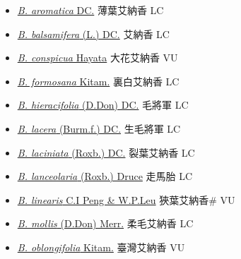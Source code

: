 \begin{itemize}
  \begin{itemize}
        \item[] \href{http://www.theplantlist.org/tpl1.1/search?q=Blumea+aromatica}{\textit{B. aromatica} DC.}   薄葉艾納香 LC
        \item[] \href{http://www.theplantlist.org/tpl1.1/search?q=Blumea+balsamifera}{\textit{B. balsamifera} (L.) DC.}   艾納香 LC
        \item[] \href{http://www.theplantlist.org/tpl1.1/search?q=Blumea+conspicua}{\textit{B. conspicua} Hayata}   大花艾納香 VU
        \item[] \href{http://www.theplantlist.org/tpl1.1/search?q=Blumea+formosana}{\textit{B. formosana} Kitam.}   裏白艾納香 LC
        \item[] \href{http://www.theplantlist.org/tpl1.1/search?q=Blumea+hieracifolia}{\textit{B. hieracifolia} (D.Don) DC.}   毛將軍 LC
        \item[] \href{http://www.theplantlist.org/tpl1.1/search?q=Blumea+lacera}{\textit{B. lacera} (Burm.f.) DC.}   生毛將軍 LC
        \item[] \href{http://www.theplantlist.org/tpl1.1/search?q=Blumea+laciniata}{\textit{B. laciniata} (Roxb.) DC.}   裂葉艾納香 LC
        \item[] \href{http://www.theplantlist.org/tpl1.1/search?q=Blumea+lanceolaria}{\textit{B. lanceolaria} (Roxb.) Druce}   走馬胎 LC
        \item[] \href{http://www.theplantlist.org/tpl1.1/search?q=Blumea+linearis}{\textit{B. linearis} C.I Peng \& W.P.Leu}   狹葉艾納香\# VU
        \item[] \href{http://www.theplantlist.org/tpl1.1/search?q=Blumea+mollis}{\textit{B. mollis} (D.Don) Merr.}   柔毛艾納香 LC
        \item[] \href{http://www.theplantlist.org/tpl1.1/search?q=Blumea+oblongifolia}{\textit{B. oblongifolia} Kitam.}   臺灣艾納香 VU

\end{itemize}
\end{itemize}
